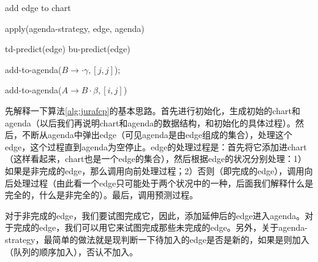 \documentclass{article}
\begin{document}
\begin{CJK}{UTF8}{gbsn}
\begin{algorithm}
\vspace{1pc}
\begin{algorithmic}
\STATE add edge to chart
\ENDIF
\end{algorithmic}

\vspace{1pc}
\begin{algorithmic}
\STATE apply(agenda-strategy, edge, agenda)
\ENDIF
\end{algorithmic}

\vspace{1pc}
\begin{algorithmic}
\STATE td-predict(edge)
\STATE bu-predict(edge)
\ENDIF
\end{algorithmic}

\vspace{1pc}
\begin{algorithmic}
\STATE add-to-agenda($B\to \cdot \gamma,[j,j]$);
\ENDFOR
\end{algorithmic}

\vspace{1pc}
\begin{algorithmic}
\STATE add-to-agenda($A\to B\cdot \beta,[i,j]$)
\ENDFOR
\end{algorithmic}
\label{alg:jurafcp}
\end{algorithm}

先解释一下算法\ref{alg:jurafcp}的基本思路。首先进行初始化，生成初始的chart和agenda（以后我们再说明chart和agenda的数据结构，和初始化的具体过程）。然后，不断从agenda中弹出edge（可见agenda是由edge组成的集合），处理这个edge，这个过程直到agenda为空停止。edge的处理过程是：首先将它添加进chart（这样看起来，chart也是一个edge的集合），然后根据edge的状况分别处理：1）如果是非完成的edge，那么调用向前处理过程；2）否则（即完成的edge），调用向后处理过程（由此看一个edge只可能处于两个状况中的一种，后面我们解释什么是完全的，什么是非完全的）。最后，调用预测过程。

对于非完成的edge，我们要试图完成它，因此，添加延伸后的edge进入agenda。对于完成的edge，我们可以用它来试图完成那些未完成的edge。另外，关于agenda-strategy，最简单的做法就是现判断一下待加入的edge是否是新的，如果是则加入（队列的顺序加入），否认不加入。


\end{CJK}
\end{document}
